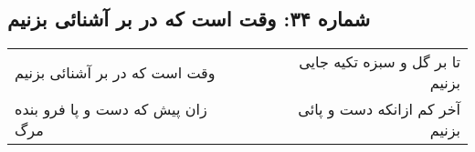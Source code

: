 \begin{center}
\section*{شماره ۳۴: وقت است که در بر آشنائی بزنیم}
\label{sec:034}
\begin{longtable}{l p{0.5cm} r}
وقت است که در بر آشنائی بزنیم
&&
تا بر گل و سبزه تکیه جایی بزنیم
\\
زان پیش که دست و پا فرو بنده مرگ
&&
آخر کم ازانکه دست و پائی بزنیم
\\
\end{longtable}
\end{center}
